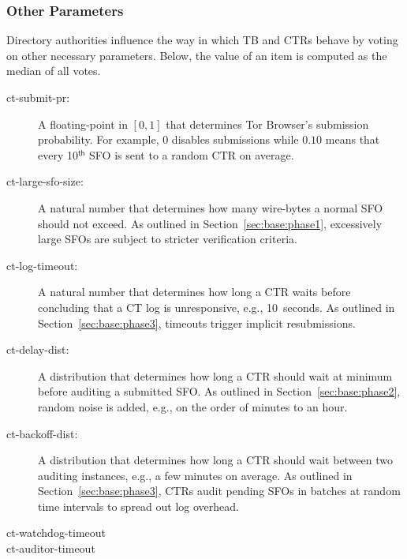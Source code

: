 \subsubsection{Other Parameters} \label{sec:base:consensus:params} Directory
authorities influence the way in which TB and CTRs behave by voting on other
necessary parameters. Below, the value of an item is computed as the median of
all votes.
\begin{description}
    \item[ct-submit-pr:] A floating-point in $[0,1]$ that determines Tor
        Browser's submission probability.  For example, $0$ disables submissions
        while $0.10$ means that every 10$^{\mathsf{th}}$ SFO is sent to a random
        CTR on average.
    \item[ct-large-sfo-size:] A natural number that determines how many
        wire-bytes a normal SFO should not exceed.  As outlined in
        Section~\ref{sec:base:phase1}, excessively large SFOs are subject to
        stricter verification criteria.
    \item[ct-log-timeout:] A natural number that determines how long a CTR waits
        before concluding that a CT log is unresponsive, e.g., 10~seconds. As
        outlined in Section~\ref{sec:base:phase3}, timeouts trigger implicit
        resubmissions.
    \item[ct-delay-dist:] A distribution that determines how long a CTR should
        wait at minimum before auditing a submitted SFO\@.  As outlined in
        Section~\ref{sec:base:phase2}, random noise is added, e.g., on the order
        of minutes to an hour.
    \item[ct-backoff-dist:]
        A distribution that determines how long a CTR should wait between two
        auditing instances, e.g., a few minutes on average.  As outlined in
        Section~\ref{sec:base:phase3}, CTRs audit pending SFOs in batches at
        random time intervals to spread out log overhead.
    \item[ct-watchdog-timeout]
    \item[ct-auditor-timeout]
\end{description}
